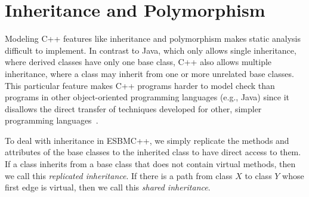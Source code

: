 \documentclass[conference]{IEEEtran}
\newcommand{\comment}[1]{}
\begin{document}
\comment{
We have elaborated a hierarchical structure for the
input/output (I/O) stream library that is similar to the actual
one (as described in~\cite{CppReference12}). However,
in our I/O stream operational model, the input operator $>>$
is simply modeled as a non-deterministic variable and we do not check
any related safety property. Similarly, the output operator $<<$ does not
present any constraints or properties to be checked since
we do not check whether a given value has been printed on the screen
(ESBMC++ is only interested in checking the properties related to
software and not that of hardware).}




\section{Inheritance and Polymorphism}
\label{inheritance-and-polymorphism}

Modeling C++ features like inheritance and polymorphism
makes static analysis difficult to implement.
In contrast to Java, which only allows single inheritance, where derived classes
have only one base class, C++ also allows multiple inheritance, where a class
may inherit from one or more unrelated base classes. This particular feature
makes C++ programs harder to model check than programs in other object-oriented
programming languages (e.g., Java) since it disallows the direct transfer of
techniques developed for other, simpler programming languages~\cite{Pasareanu04,Visser05}.

To deal with inheritance in ESBMC++, we simply replicate the methods
and attributes of the base classes to the inherited class to have
direct access to them. If a class inherits from
a base class that does not contain virtual methods,
then we call this \textit{replicated inheritance}. If there is a path from
class $\mathit{X}$ to class $\mathit{Y}$ whose first edge is virtual, then
we call this \textit{shared inheritance}.
\end{document}
